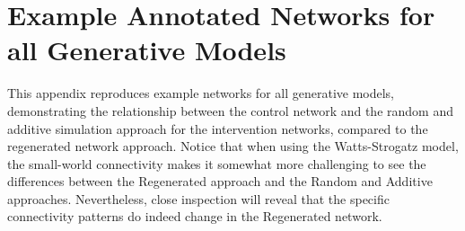 \documentclass{article}
\theoremstyle{definition}
\begin{document}
\section{\textbf{Example Annotated Networks for all Generative Models}}
\label{Appendix 4}
This appendix reproduces example networks for all generative models, demonstrating the relationship between the control network and the random and additive simulation approach for the intervention networks, compared to the regenerated network approach. Notice that when using the Watts-Strogatz model, the small-world connectivity makes it somewhat more challenging to see the differences between the Regenerated approach and the Random and Additive approaches. Nevertheless, close inspection will reveal that the specific connectivity patterns do indeed change in the Regenerated network.
\end{document}
